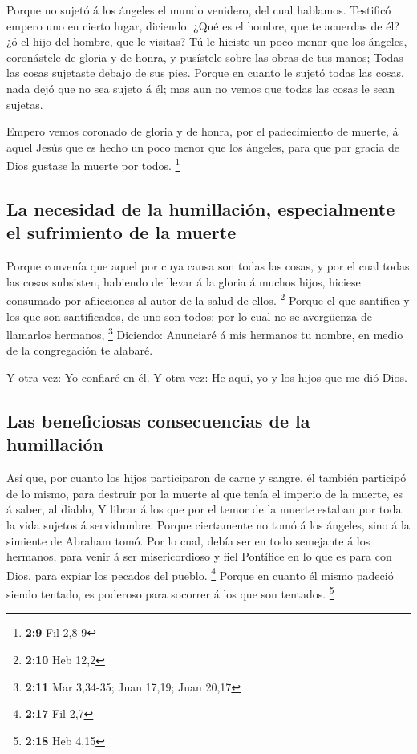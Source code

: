  Porque no sujetó á los ángeles el mundo venidero, del cual
hablamos.  Testificó empero uno en cierto lugar, diciendo:
¿Qué es el hombre, que te acuerdas de él? ¿ó el hijo del hombre, que le
visitas?  Tú le hiciste un poco menor que los ángeles,
coronástele de gloria y de honra, y pusístele sobre las obras de tus
manos;  Todas las cosas sujetaste debajo de sus pies. Porque
en cuanto le sujetó todas las cosas, nada dejó que no sea sujeto á él;
mas aun no vemos que todas las cosas le sean sujetas.

 Empero vemos coronado de gloria y de honra, por el
padecimiento de muerte, á aquel Jesús que es hecho un poco menor que los
ángeles, para que por gracia de Dios gustase la muerte por todos.
\footnote{\textbf{2:9} Fil 2,8-9}

\hypertarget{la-necesidad-de-la-humillaciuxf3n-especialmente-el-sufrimiento-de-la-muerte}{%
\subsection{La necesidad de la humillación, especialmente el sufrimiento
de la
muerte}\label{la-necesidad-de-la-humillaciuxf3n-especialmente-el-sufrimiento-de-la-muerte}}

 Porque convenía que aquel por cuya causa son todas las
cosas, y por el cual todas las cosas subsisten, habiendo de llevar á la
gloria á muchos hijos, hiciese consumado por aflicciones al autor de la
salud de ellos. \footnote{\textbf{2:10} Heb 12,2}  Porque
el que santifica y los que son santificados, de uno son todos: por lo
cual no se avergüenza de llamarlos hermanos, \footnote{\textbf{2:11} Mar
  3,34-35; Juan 17,19; Juan 20,17}  Diciendo: Anunciaré á
mis hermanos tu nombre, en medio de la congregación te alabaré.

 Y otra vez: Yo confiaré en él. Y otra vez: He aquí, yo y
los hijos que me dió Dios.

\hypertarget{las-beneficiosas-consecuencias-de-la-humillaciuxf3n}{%
\subsection{Las beneficiosas consecuencias de la
humillación}\label{las-beneficiosas-consecuencias-de-la-humillaciuxf3n}}

 Así que, por cuanto los hijos participaron de carne y
sangre, él también participó de lo mismo, para destruir por la muerte al
que tenía el imperio de la muerte, es á saber, al diablo, 
Y librar á los que por el temor de la muerte estaban por toda la vida
sujetos á servidumbre.  Porque ciertamente no tomó á los
ángeles, sino á la simiente de Abraham tomó.  Por lo cual,
debía ser en todo semejante á los hermanos, para venir á ser
misericordioso y fiel Pontífice en lo que es para con Dios, para expiar
los pecados del pueblo. \footnote{\textbf{2:17} Fil 2,7} 
Porque en cuanto él mismo padeció siendo tentado, es poderoso para
socorrer á los que son tentados. \footnote{\textbf{2:18} Heb 4,15}

